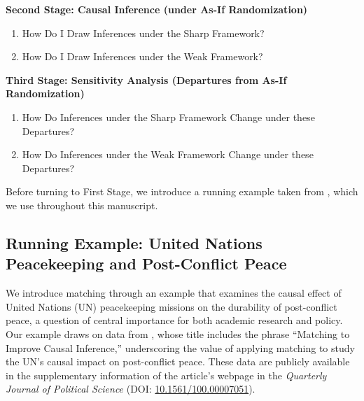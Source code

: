 \documentclass[
  12pt,
  leqno]{article}
\begin{document}
\textbf{Second Stage: Causal Inference (under As-If Randomization)}

\begin{enumerate}
\def\labelenumi{(\alph{enumi})}
\item
  How Do I Draw Inferences under the Sharp Framework?
\item
  How Do I Draw Inferences under the Weak Framework?
\end{enumerate}

\textbf{Third Stage: Sensitivity Analysis (Departures from As-If
Randomization)}

\begin{enumerate}
\def\labelenumi{(\alph{enumi})}
\item
  How Do Inferences under the Sharp Framework Change under these
  Departures?
\item
  How Do Inferences under the Weak Framework Change under these
  Departures?
\end{enumerate}

Before turning to First Stage, we introduce a running example taken from
\citet{gilligansergenti2008}, which we use throughout this manuscript.

\subsection{Running Example: United Nations Peacekeeping and
Post-Conflict
Peace}\label{running-example-united-nations-peacekeeping-and-post-conflict-peace}

We introduce matching through an example that examines the causal effect
of United Nations (UN) peacekeeping missions on the durability of
post-conflict peace, a question of central importance for both academic
research and policy. Our example draws on data from
\citet{gilligansergenti2008}, whose title includes the phrase ``Matching
to Improve Causal Inference,'' underscoring the value of applying
matching to study the UN's causal impact on post-conflict peace. These
data are publicly available in the supplementary information of the
article's webpage in the \emph{Quarterly Journal of Political Science}
(DOI:
\href{https://doi.org/10.1561/100.00007051}{10.1561/100.00007051}).
\end{document}
